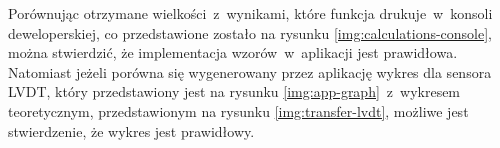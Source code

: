 Porównując otrzymane wielkości~z~wynikami, które funkcja drukuje~w~konsoli deweloperskiej, co
przedstawione zostało na rysunku \ref{img:calculations-console}, można stwierdzić, że implementacja
wzorów~w~aplikacji jest prawidłowa. Natomiast jeżeli porówna się wygenerowany przez aplikację wykres
dla sensora LVDT, który przedstawiony jest na rysunku \ref{img:app-graph}~z~wykresem teoretycznym,
przedstawionym na rysunku \ref{img:transfer-lvdt}, możliwe jest stwierdzenie, że wykres jest
prawidłowy.


